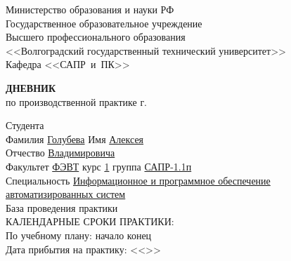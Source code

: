 \begin{titlepage}
    \begin{center}
        Министерство образования и науки РФ \\
        Государственное образовательное учреждение\\
        Высшего профессионального образования\\
        <<Волгоградский государственный технический университет>>\\
        Кафедра <<САПР~и~ПК>>
    \end{center}
    \vspace{0.5cm}
    \begin{center}
        \large \textbf{ДНЕВНИК} \\
        по производственной практике \the\year г.
    \end{center}
    \begin{flushleft}
        Студента\\
        Фамилия \underline{Голубева\hspace{3.1cm}} 
        Имя \underline{Алексея\hspace{2.1cm}}\\
        Отчество \underline{Владимировича\hspace{1.6cm}}\\
        Факультет \underline{ФЭВТ\hspace{3.45cm}} курс \underline{1\hspace{1.5cm}} 
        группа \underline{САПР-1.1п\hspace{2.6cm}}\\
        \vspace{1cm}
        Специальность \underline{Информационное и программное обеспечение\hspace{3.4cm}}\\
        \underline{автоматизированных систем\hspace{10.85cm}}\\
        База проведения практики \underline{\hspace{11.1cm}}\\
        \vspace{1cm}
        КАЛЕНДАРНЫЕ СРОКИ ПРАКТИКИ:\\
        По учебному плану: \hspace{0.2cm} начало \underline{\hspace{4.5cm}} 
        конец \underline{\hspace{4.5cm}}\\
        Дата прибытия на практику: <<\underline{\hspace{1cm}}>> \underline{\hspace{3cm}} 

\end{flushleft}
\end{titlepage}
